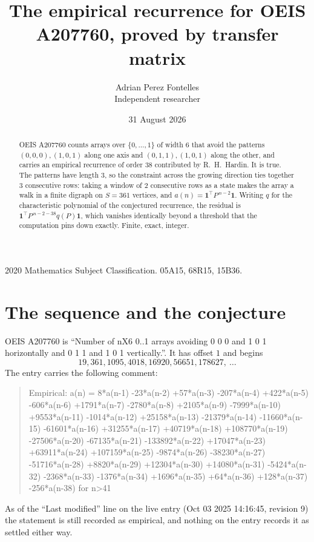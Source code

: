\documentclass[11pt,a4paper]{article}
\title{The empirical recurrence for OEIS A207760, proved by transfer matrix}
\author{Adrian Perez Fontelles\\ \small Independent researcher}
\date{31 August 2026}
\theoremstyle{plain}
\theoremstyle{definition}
\begin{document}
\maketitle

\begin{abstract}
OEIS A207760 counts arrays over $\{0,\dots,1\}$ of width $6$ that avoid the patterns
$(0,0,0), (1,0,1)$ along one axis and $(0,1,1), (1,0,1)$ along the other, and carries an empirical recurrence of
order $38$ contributed by R.~H.~Hardin. It is true. The patterns have length $3$, so
the constraint across the growing direction ties together $3$ consecutive rows: taking a
window of $2$ consecutive rows as a state makes the array a walk in a finite digraph
on $S=361$ vertices, and $a(n)=\mathbf{1}^{\!\top}P^{\,n-2}\mathbf{1}$. Writing $q$
for the characteristic polynomial of the conjectured recurrence, the residual is
$\mathbf{1}^{\!\top}P^{\,n-2-38}q(P)\mathbf{1}$, which vanishes identically
beyond a threshold that the computation pins down exactly. Finite, exact, integer.
\end{abstract}

\noindent\small 2020 Mathematics Subject Classification. 05A15, 68R15, 15B36.\normalsize

\section{The sequence and the conjecture}

OEIS A207760 is ``Number of nX6 0..1 arrays avoiding 0 0 0 and 1 0 1 horizontally and 0 1 1 and 1 0 1 vertically.''. It has offset
$1$ and begins
\[
19, 361, 1095, 4018, 16920, 56651, 178627,\ \dots
\]
The entry carries the following comment:
\begin{quote}\small
Empirical: a(n) = 8*a(n-1) -23*a(n-2) +57*a(n-3) -207*a(n-4) +422*a(n-5) -606*a(n-6) +1791*a(n-7) -2780*a(n-8) +2105*a(n-9) -7999*a(n-10) +9553*a(n-11) -1014*a(n-12) +25158*a(n-13) -21379*a(n-14) -11660*a(n-15) -61601*a(n-16) +31255*a(n-17) +40719*a(n-18) +108770*a(n-19) -27506*a(n-20) -67135*a(n-21) -133892*a(n-22) +17047*a(n-23) +63911*a(n-24) +107159*a(n-25) -9874*a(n-26) -38230*a(n-27) -51716*a(n-28) +8820*a(n-29) +12304*a(n-30) +14080*a(n-31) -5424*a(n-32) -2368*a(n-33) -1376*a(n-34) +1696*a(n-35) +64*a(n-36) +128*a(n-37) -256*a(n-38) for n>41
\end{quote}
As of the ``Last modified'' line on the live entry (Oct 03 2025 14:16:45, revision
9) the statement is still recorded as empirical, and nothing on the entry
records it as settled either way.
\end{document}
